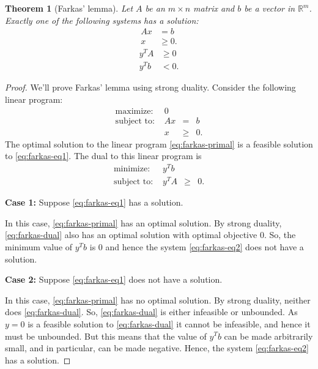 \documentclass[
]{book}
\newtheorem{theorem}{Theorem}[chapter]
\theoremstyle{definition}
\theoremstyle{definition}
\theoremstyle{definition}
\theoremstyle{definition}
\theoremstyle{remark}
\begin{document}
\begin{theorem}[Farkas' lemma]
\protect\hypertarget{thm:farkas-lemma}{}\label{thm:farkas-lemma}Let \(A\) be an \(m \times n\) matrix and \(b\) be a vector in \(\mathbb{R}^m\).
Exactly one of the following systems has a solution:
\begin{align}
  A x & = b \\ 
  x & \ge 0.
\label{eq:farkas-eq1}
\end{align}
\begin{align}
  y^T A & \ge 0 \\ 
  y^T b & < 0.
\label{eq:farkas-eq2}
\end{align}
\end{theorem}

\begin{proof}
We'll prove Farkas' lemma using strong duality. Consider the following linear program:
\begin{equation}
  \begin{array}{llll}
    \mbox{maximize: } & 0 \\
    \mbox{subject to: } 
      & A x & = & b \\ 
      & x & \ge & 0.
  \end{array}
\label{eq:farkas-primal}
\end{equation}
The optimal solution to the linear program \eqref{eq:farkas-primal} is a feasible solution to \eqref{eq:farkas-eq1}. The dual to this linear program is
\begin{equation}
  \begin{array}{llll}
    \mbox{minimize: } & y^T b \\
    \mbox{subject to: } 
      & y^T A & \ge & 0.
  \end{array}
\label{eq:farkas-dual}
\end{equation}

\textbf{Case 1:} Suppose \eqref{eq:farkas-eq1} has a solution.

In this case, \eqref{eq:farkas-primal} has an optimal solution. By strong duality, \eqref{eq:farkas-dual} also has an optimal solution with optimal objective \(0\). So, the minimum value of \(y^T b\) is \(0\) and hence the system \eqref{eq:farkas-eq2} does not have a solution.

\textbf{Case 2:} Suppose \eqref{eq:farkas-eq1} does not have a solution.

In this case, \eqref{eq:farkas-primal} has no optimal solution. By strong duality, neither does \eqref{eq:farkas-dual}. So, \eqref{eq:farkas-dual} is either infeasible or unbounded. As \(y = 0\) is a feasible solution to \eqref{eq:farkas-dual} it cannot be infeasible, and hence it must be unbounded. But this means that the value of \(y^T b\) can be made arbitrarily small, and in particular, can be made negative. Hence, the system \eqref{eq:farkas-eq2} has a solution.
\end{proof}
\end{document}
